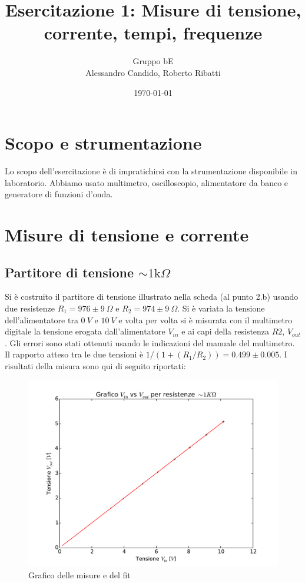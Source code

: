 \documentclass[10pt,a4paper]{article}
\title{Esercitazione 1: Misure di tensione, corrente, tempi, frequenze}
\author{Gruppo bE \\ Alessandro Candido, Roberto Ribatti}
\date{\today}
\newcommand\ohm{\Omega}
\newcommand\K{\text{k}}
\begin{document}
\maketitle

\section{Scopo e strumentazione}
Lo scopo dell'esercitazione è di impratichirsi con la strumentazione disponibile in laboratorio. Abbiamo usato multimetro, oscilloscopio, alimentatore da banco e generatore di funzioni d'onda.

\section{Misure di tensione e corrente}

\subsection{Partitore di tensione $\sim1 \K \ohm$}
Si è costruito il partitore di tensione illustrato nella scheda (al punto 2.b) usando due resistenze $R_1 = 976 \pm 9~\ohm$ e $R_2 = 974 \pm 9 ~\ohm$.
Si è variata la tensione dell'alimentatore tra $0~V$ e $10~V$ e volta per volta si è misurata con il multimetro digitale la tensione erogata dall'alimentatore $V_{in}$ e ai capi della resistenza $R2$, $V_{out}$. Gli errori sono stati ottenuti usando le indicazioni del manuale del multimetro.
Il rapporto atteso tra le due tensioni è $1/(1+(R_1/R_2))=0.499 \pm 0.005$. 
I risultati della misura sono qui di seguito riportati:

\begin{figure}[h]
\centering
	\begin{minipage}[h]{0.45\textwidth}
	\centering
	
	\end{minipage}%
	\begin{minipage}[h]{0.55\textwidth}
	\centering
	\includegraphics[width=1\textwidth]{../grafici/fit_1KOhm.pdf}
	\caption{Grafico delle misure e del fit}
	\end{minipage}
\end{figure}
\end{document}
